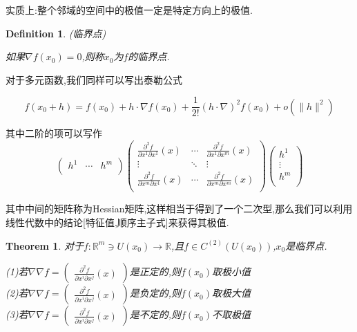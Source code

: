 \documentclass[11pt,hyperref,a4paper,UTF8]{ctexart}
\newtheorem{theorem}{Theorem}[subsection]
\newtheorem{definition}{Definition}[subsection]
\newcommand{\RR}{\mathbb{R}}
\begin{document}
\begin{CJK}{UTF8}{gkai}
实质上:整个邻域的空间中的极值一定是特定方向上的极值.

\begin{definition}
  (临界点)

  如果$\nabla f(x_0) = 0$,则称$x_0$为$f$的临界点.
\end{definition}

对于多元函数,我们同样可以写出泰勒公式

\[f(x_0 + h) = f(x_0) + h \cdot \nabla f(x_0) + \frac{1}{2!} (h \cdot \nabla)^2 f(x_0) + o(\|h\|^2)\]

其中二阶的项可以写作
\[
  \begin{pmatrix}
    h^1&\cdots&h^m\\
  \end{pmatrix}
  \begin{pmatrix}
  \frac{\partial^2 f}{\partial x^1 \partial x^1}(x)&\cdots&\frac{\partial^2 f}{\partial x^1 \partial x^m}(x)\\
  \vdots&\ddots&\vdots\\
  \frac{\partial^2 f}{\partial x^m \partial x^1}(x)&\cdots&\frac{\partial^2 f}{\partial x^m \partial x^m}(x)\\
\end{pmatrix}
\begin{pmatrix}
  h^1\\
  \vdots\\
  h^m\\
\end{pmatrix}
\]

其中中间的矩阵称为Hessian矩阵,这样相当于得到了一个二次型,那么我们可以利用线性代数中的结论[特征值,顺序主子式]来获得其极值.

\begin{theorem}
  对于$f: \RR^m \owns U(x_0) \to \RR$,且$f \in C^{(2)} (U(x_0))$,$x_0$是临界点.
  
  (1)若$\nabla \nabla f =   \begin{pmatrix}
    \frac{\partial^2 f}{\partial x^i \partial x^j}(x)
  \end{pmatrix}$是正定的,则$f(x_0)$取极小值\\

  (2)若$\nabla \nabla f =   \begin{pmatrix}
    \frac{\partial^2 f}{\partial x^i \partial x^j}(x)
  \end{pmatrix}$是负定的,则$f(x_0)$取极大值\\

  (3)若$\nabla \nabla f =   \begin{pmatrix}
    \frac{\partial^2 f}{\partial x^i \partial x^j}(x)
  \end{pmatrix}$是不定的,则$f(x_0)$不取极值\\
\end{theorem}


\end{CJK}
\end{document}
